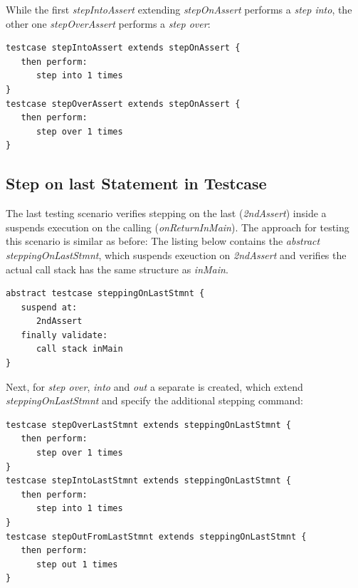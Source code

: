 While the first  \emph{stepIntoAssert} extending
\emph{stepOnAssert} performs a \emph{step into}, the other one
\emph{stepOverAssert} performs a \emph{step over}:

\begin{lstlisting}[language=testingDSL]
testcase stepIntoAssert extends stepOnAssert {            
   then perform:                         
      step into 1 times                            
}
testcase stepOverAssert extends stepOnAssert {            
   then perform:                         
      step over 1 times                            
}
\end{lstlisting}

\subsection{Step on last Statement in Testcase}

The last testing scenario verifies stepping on the last 
(\emph{2ndAssert}) inside a  suspends execution on the calling
 (\emph{onReturnInMain}).
The approach for testing this scenario is similar as before:
The listing below contains the \emph{abstract} 
\emph{steppingOnLastStmnt}, which suspends exeuction on
\emph{2ndAssert} and verifies the actual call stack has the same structure as
\emph{inMain}.

\begin{lstlisting}[language=testingDSL]
abstract testcase steppingOnLastStmnt {
   suspend at: 
      2ndAssert
   finally validate:
      call stack inMain
}
\end{lstlisting}

Next, for \emph{step over}, \emph{into} and \emph{out} a separate
 is created, which extend \emph{steppingOnLastStmnt} and
specify the additional stepping command:

\begin{lstlisting}[language=testingDSL]
testcase stepOverLastStmnt extends steppingOnLastStmnt {            
   then perform:                         
      step over 1 times                            
}
testcase stepIntoLastStmnt extends steppingOnLastStmnt {            
   then perform:                         
      step into 1 times                            
}
testcase stepOutFromLastStmnt extends steppingOnLastStmnt {            
   then perform:                         
      step out 1 times                            
}
\end{lstlisting}		
			
	